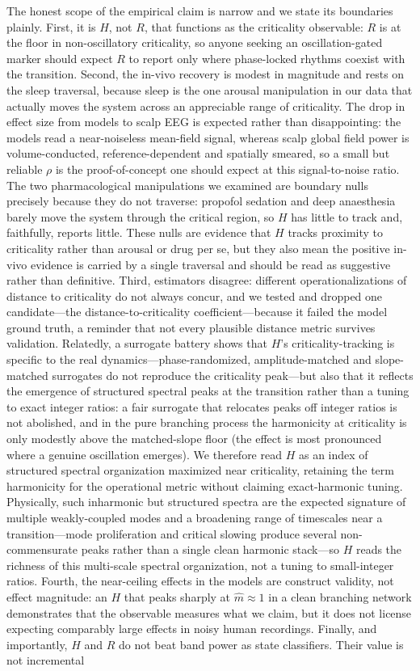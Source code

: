\documentclass[11pt]{article}
\begin{document}
The honest scope of the empirical claim is narrow and we state its boundaries plainly. First, it is $H$, not $R$, that functions as the criticality observable: $R$ is at the floor in non-oscillatory criticality, so anyone seeking an oscillation-gated marker should expect $R$ to report only where phase-locked rhythms coexist with the transition. Second, the in-vivo recovery is modest in magnitude and rests on the sleep traversal, because sleep is the one arousal manipulation in our data that actually moves the system across an appreciable range of criticality. The drop in effect size from models to scalp EEG is expected rather than disappointing: the models read a near-noiseless mean-field signal, whereas scalp global field power is volume-conducted, reference-dependent and spatially smeared, so a small but reliable $\rho$ is the proof-of-concept one should expect at this signal-to-noise ratio. The two pharmacological manipulations we examined are boundary nulls precisely because they do not traverse: propofol sedation and deep anaesthesia barely move the system through the critical region, so $H$ has little to track and, faithfully, reports little. These nulls are evidence that $H$ tracks proximity to criticality rather than arousal or drug per se, but they also mean the positive in-vivo evidence is carried by a single traversal and should be read as suggestive rather than definitive. Third, estimators disagree: different operationalizations of distance to criticality do not always concur, and we tested and dropped one candidate---the distance-to-criticality coefficient---because it failed the model ground truth, a reminder that not every plausible distance metric survives validation. Relatedly, a surrogate battery shows that $H$'s criticality-tracking is specific to the real dynamics---phase-randomized, amplitude-matched and slope-matched surrogates do not reproduce the criticality peak---but also that it reflects the emergence of structured spectral peaks at the transition rather than a tuning to exact integer ratios: a fair surrogate that relocates peaks off integer ratios is not abolished, and in the pure branching process the harmonicity at criticality is only modestly above the matched-slope floor (the effect is most pronounced where a genuine oscillation emerges). We therefore read $H$ as an index of structured spectral organization maximized near criticality, retaining the term harmonicity for the operational metric without claiming exact-harmonic tuning. Physically, such inharmonic but structured spectra are the expected signature of multiple weakly-coupled modes and a broadening range of timescales near a transition---mode proliferation and critical slowing produce several non-commensurate peaks rather than a single clean harmonic stack---so $H$ reads the richness of this multi-scale spectral organization, not a tuning to small-integer ratios. Fourth, the near-ceiling effects in the models are construct validity, not effect magnitude: an $H$ that peaks sharply at $\hat m \approx 1$ in a clean branching network demonstrates that the observable measures what we claim, but it does not license expecting comparably large effects in noisy human recordings. Finally, and importantly, $H$ and $R$ do not beat band power as state classifiers. Their value is not incremental 
\end{document}
